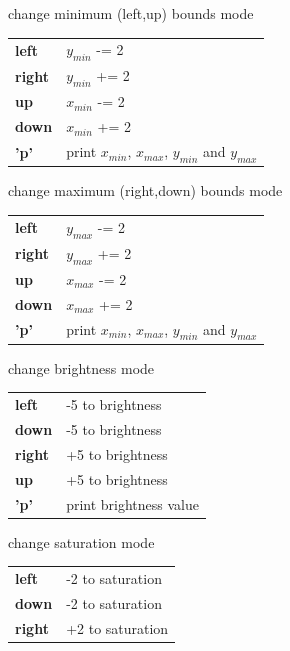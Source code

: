     \begin{description} \itemindent=-15pt
        \item['l'] change minimum (left,up) bounds mode \\
            \begin{tabular}{ll}
                {\bf left } & $y_{min}$ -= 2 \\
                {\bf right} & $y_{min}$ += 2 \\
                {\bf up   } & $x_{min}$ -= 2 \\
                {\bf down } & $x_{min}$ += 2 \\
                {\bf 'p'  } & print $x_{min}$, $x_{max}$, $y_{min}$ and $y_{max}$
            \end{tabular}
        \item['u'] change maximum (right,down) bounds mode \\
            \begin{tabular}{ll}
                {\bf left } & $y_{max}$ -= 2 \\
                {\bf right} & $y_{max}$ += 2 \\
                {\bf up   } & $x_{max}$ -= 2 \\
                {\bf down } & $x_{max}$ += 2 \\
                {\bf 'p'  } & print $x_{min}$, $x_{max}$, $y_{min}$ and $y_{max}$ 
            \end{tabular}
        \item['b']  change brightness mode \\
            \begin{tabular}{ll} 
                {\bf left } & -5 to brightness \\
                {\bf down } & -5 to brightness \\
                {\bf right} & +5 to brightness \\
                {\bf up   } & +5 to brightness \\
                {\bf 'p'  } & print brightness value 
            \end{tabular}
        \item['s'] change saturation mode \\
            \begin{tabular}{ll}
                {\bf left } & -2 to saturation \\
                {\bf down } & -2 to saturation \\
                {\bf right} & +2 to saturation \\

\end{tabular}
\end{description}

